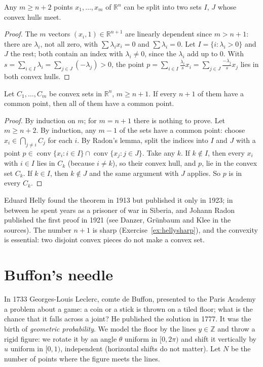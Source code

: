 \begin{lemma}[Radon, 1921]\label{lem:radon}
Any $m\ge n+2$ points $x_1,\dots,x_m$ of $\mathbb R^n$ can be split into two sets $I$, $J$ whose convex hulls meet.
\end{lemma}

\begin{proof}
The $m$ vectors $(x_i,1)\in\mathbb R^{n+1}$ are linearly dependent since $m>n+1$: there are $\lambda_i$, not all zero, with $\sum\lambda_ix_i=0$ and $\sum\lambda_i=0$.
Let $I=\{i:\lambda_i>0\}$ and $J$ the rest; both contain an index with $\lambda_i\ne0$, since the $\lambda_i$ add up to $0$. With
$s=\sum_{i\in I}\lambda_i=\sum_{j\in J}(-\lambda_j)>0$, the point $p=\sum_{i\in I}\frac{\lambda_i}sx_i=\sum_{j\in J}\frac{-\lambda_j}sx_j$ lies in both convex hulls.
\end{proof}

\begin{theorem}[Helly]\label{thm:helly}
Let $C_1,\dots,C_m$ be convex sets in $\mathbb R^n$, $m\ge n+1$. If every $n+1$ of them have a common point, then all of them have a common point.
\end{theorem}

\begin{proof}
By induction on $m$; for $m=n+1$ there is nothing to prove. Let $m\ge n+2$. By induction, any $m-1$ of the sets have a common point: choose
$x_i\in\bigcap_{j\ne i}C_j$ for each $i$. By Radon's lemma, split the indices into $I$ and $J$ with a point $p\in\operatorname{conv}\{x_i:i\in I\}\cap
\operatorname{conv}\{x_j:j\in J\}$. Take any $k$. If $k\notin I$, then every $x_i$ with $i\in I$ lies in $C_k$ (because $i\ne k$), so their convex hull, and $p$, lie in
the convex set $C_k$. If $k\in I$, then $k\notin J$ and the same argument with $J$ applies. So $p$ is in every $C_k$.
\end{proof}

Eduard Helly found the theorem in 1913 but published it only in 1923; in between he spent years as a prisoner of war in Siberia, and Johann Radon
published the first proof in 1921 (see Danzer, Gr\"unbaum and Klee in the sources). The number $n+1$ is sharp (Exercise~\ref{ex:hellysharp}), and the
convexity is essential: two disjoint convex pieces do not make a convex set.

\section{Buffon's needle}

In 1733 Georges-Louis Leclerc, comte de Buffon, presented to the Paris Academy a problem about a game: a coin or a stick is thrown on a tiled floor; what is the
chance that it falls across a joint? He published the solution in 1777. It was the birth of \emph{geometric probability}. We model the floor by the lines
$y\in\mathbb Z$ and throw a rigid figure: we rotate it by an angle $\theta$ uniform in $[0,2\pi)$ and shift it vertically by $u$ uniform in $[0,1)$, independent
(horizontal shifts do not matter). Let $N$ be the number of points where the figure meets the lines.

